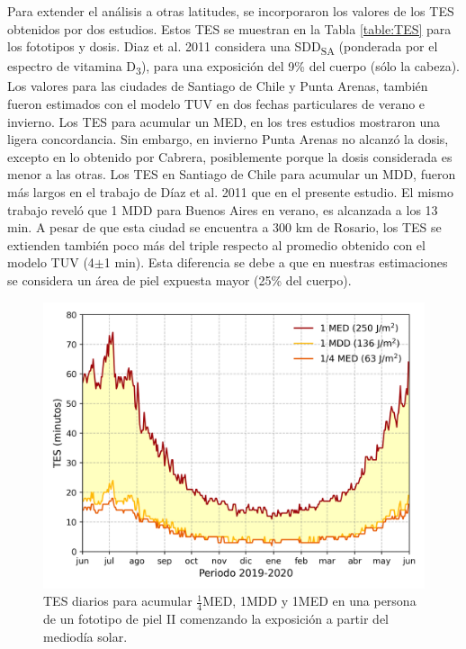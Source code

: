 \documentclass[10pt,twocolumn]{article}
\begin{document}
Para extender el análisis a otras latitudes, se incorporaron los valores de los TES obtenidos por dos estudios\cite{Diaz2011,cabrera_radiacion_2005}. Estos TES se muestran en la Tabla \ref{table:TES} para los fototipos y dosis. Diaz et al. 2011 considera una SDD\textsubscript{SA} (ponderada por el espectro de vitamina D\textsubscript{3}), para una exposición del 9\% del cuerpo (sólo la cabeza). Los valores para las ciudades de Santiago de Chile y Punta Arenas, también fueron estimados con el modelo TUV en dos fechas particulares de verano e invierno. Los TES para acumular un MED, en los tres estudios mostraron una ligera concordancia. Sin embargo, en invierno Punta Arenas no alcanzó la dosis, excepto en lo obtenido por Cabrera, posiblemente porque la dosis considerada es menor a las otras. Los TES en Santiago de Chile para acumular un MDD, fueron más largos en el trabajo de Díaz et al. 2011 que en el presente estudio. El mismo trabajo reveló que 1 MDD para Buenos Aires en verano, es alcanzada a los 13 min. A pesar de que esta ciudad se encuentra a 300 km de Rosario, los TES se extienden también poco más del triple respecto al promedio obtenido con el modelo TUV (4$\pm$1 min). Esta diferencia se debe a que en nuestras estimaciones se considera un área de piel expuesta mayor (25\% del cuerpo).

\begin{figure}[ht]
  \centering
  \includegraphics[scale=0.47]{dosis_vitamin.png}
  \caption{TES diarios para acumular $\frac{1}{4}$MED, 1MDD y 1MED en una persona de un fototipo de piel II comenzando la exposición a partir del mediodía solar.}
  \label{fig:TES}
\end{figure}
\end{document}
